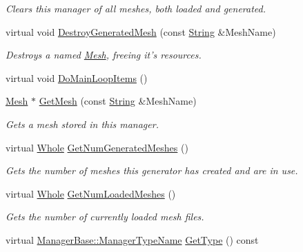 \begin{DoxyCompactItemize}
\begin{DoxyCompactList}\small\item\em Clears this manager of all meshes, both loaded and generated. \item\end{DoxyCompactList}\item 
virtual void \hyperlink{classMezzanine_1_1MeshManager_a9c9286c940e56c4ba6a02ef58bfc0374}{DestroyGeneratedMesh} (const \hyperlink{namespaceMezzanine_acf9fcc130e6ebf08e3d8491aebcf1c86}{String} \&MeshName)
\begin{DoxyCompactList}\small\item\em Destroys a named \hyperlink{classMezzanine_1_1Mesh}{Mesh}, freeing it's resources. \item\end{DoxyCompactList}\item 
virtual void \hyperlink{classMezzanine_1_1MeshManager_acfbea42e8aeb36d48522ad027f1e8764}{DoMainLoopItems} ()
\item 
\hyperlink{classMezzanine_1_1Mesh}{Mesh} $\ast$ \hyperlink{classMezzanine_1_1MeshManager_a9f564124032f9dc8a636f8092bbbc87e}{GetMesh} (const \hyperlink{namespaceMezzanine_acf9fcc130e6ebf08e3d8491aebcf1c86}{String} \&MeshName)
\begin{DoxyCompactList}\small\item\em Gets a mesh stored in this manager. \item\end{DoxyCompactList}\item 
virtual \hyperlink{namespaceMezzanine_adcbb6ce6d1eb4379d109e51171e2e493}{Whole} \hyperlink{classMezzanine_1_1MeshManager_a0b6d3fef8ecc0e12ff6de14618e788d8}{GetNumGeneratedMeshes} ()
\begin{DoxyCompactList}\small\item\em Gets the number of meshes this generator has created and are in use. \item\end{DoxyCompactList}\item 
virtual \hyperlink{namespaceMezzanine_adcbb6ce6d1eb4379d109e51171e2e493}{Whole} \hyperlink{classMezzanine_1_1MeshManager_a809d8b615341e55c3ed463b1e18c01db}{GetNumLoadedMeshes} ()
\begin{DoxyCompactList}\small\item\em Gets the number of currently loaded mesh files. \item\end{DoxyCompactList}\item 
virtual \hyperlink{classMezzanine_1_1ManagerBase_a08cecf5169cad3e82be81a3a159b0b6e}{ManagerBase::ManagerTypeName} \hyperlink{classMezzanine_1_1MeshManager_a120881dcf7bce1d3a30bedb426650c0e}{GetType} () const 

\end{DoxyCompactItemize}

